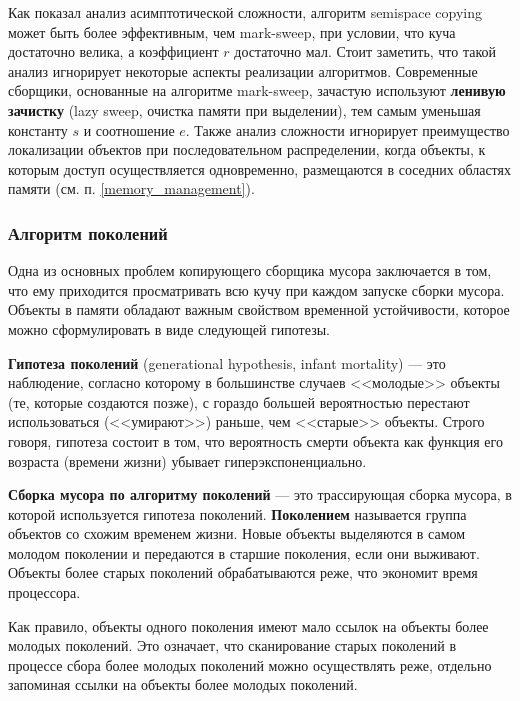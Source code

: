 Как показал анализ асимптотической сложности, алгоритм semispace copying может быть более эффективным, чем mark-sweep, при условии, что куча достаточно велика, а коэффициент $r$ достаточно мал. Стоит заметить, что такой анализ игнорирует некоторые аспекты реализации алгоритмов. Современные сборщики, основанные на алгоритме mark-sweep, зачастую используют \textbf{ленивую зачистку} (lazy sweep, очистка памяти при выделении), тем самым уменьшая константу $s$ и соотношение $e$. Также анализ сложности игнорирует преимущество локализации объектов при последовательном распределении, когда объекты, к которым доступ осуществляется одновременно, размещаются в соседних областях памяти (см. п. \ref{memory_management}).



\subsubsection{Алгоритм поколений}
\label{generational}

Одна из основных проблем копирующего сборщика мусора заключается в том, что ему приходится просматривать всю кучу при каждом запуске сборки мусора. Объекты в памяти обладают важным свойством временной устойчивости, которое можно сформулировать в виде следующей гипотезы. \cite{cornell3}

\textbf{Гипотеза поколений} (generational hypothesis, infant mortality) \cite{glossary} --- это наблюдение, согласно которому в большинстве случаев <<молодые>> объекты (те, которые создаются позже), с гораздо большей вероятностью перестают использоваться (<<умирают>>) раньше, чем <<старые>> объекты. Строго говоря, гипотеза состоит в том, что вероятность смерти объекта как функция его возраста (времени жизни) убывает гиперэкспоненциально.

\textbf{Сборка мусора по алгоритму поколений} \cite{glossary} --- это трассирующая сборка мусора, в которой используется гипотеза поколений. \textbf{Поколением} называется группа объектов со схожим временем жизни. Новые объекты выделяются в самом молодом поколении и передаются в старшие поколения, если они выживают. Объекты более старых поколений обрабатываются реже, что экономит время процессора.

Как правило, объекты одного поколения имеют мало ссылок на объекты более молодых поколений. Это означает, что сканирование старых поколений в процессе сбора более молодых поколений можно осуществлять реже, отдельно запоминая ссылки на объекты более молодых поколений. \cite{cornell3}

